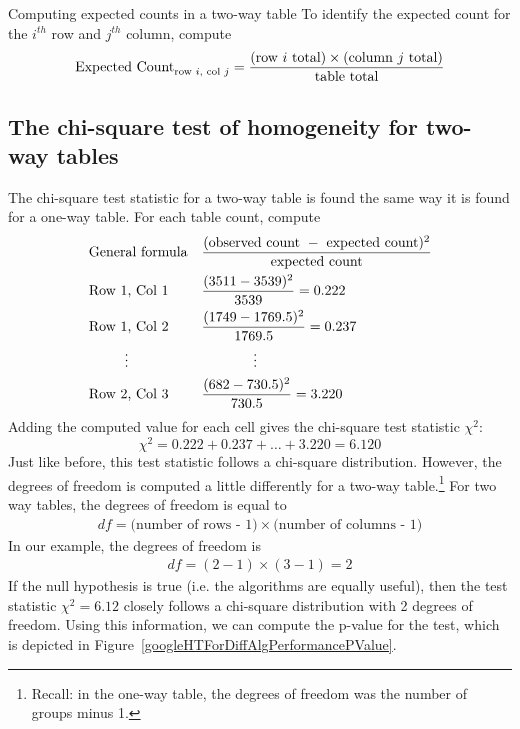 \D{\newpage}

\begin{onebox}{Computing expected counts in a two-way table}
To identify the expected count for the $i^{th}$ row and $j^{th}$ column, compute
$$\text{Expected Count}_{\text{row }i,\text{ col }j} = \frac{(\text{row $i$ total}) \times  (\text{column $j$ total})}{\text{table total}}\vspace{2mm}$$\end{onebox}


\subsection{The chi-square test of homogeneity for two-way tables}

The chi-square test statistic for a two-way table is found the same way it is found for a one-way table. For each table count, compute
\begin{align*}
&\text{General formula}& &\frac{(\text{observed count } - \text{ expected count})^2}{\text{expected count}} \\
&\text{Row 1, Col 1}& &\frac{(3511 - 3539)^2}{3539} = 0.222 \\
&\text{Row 1, Col 2}& &\frac{(1749 - 1769.5)^2}{1769.5} = 0.237 \\
& \hspace{9mm}\vdots & &\hspace{13mm}\vdots \\
&\text{Row 2, Col 3}& &\frac{(682 - 730.5)^2}{730.5} = 3.220
\end{align*}
Adding the computed value for each cell gives the chi-square test statistic $\chi^2$:
$$\chi^2 = 0.222 + 0.237 + \dots + 3.220 = 6.120$$
Just like before, this test statistic follows a chi-square distribution. However, the degrees of freedom is computed a little differently for a two-way table.\footnote{Recall: in the one-way table, the degrees of freedom was the number of groups minus 1.} For two way tables, the degrees of freedom is equal to
\begin{align*}
df = \text{(number of rows - 1)}\times \text{(number of columns - 1)}
\end{align*}
In our example, the degrees of freedom is
\begin{align*}
df = (2-1)\times (3-1) = 2
\end{align*}
If the null hypothesis is true (i.e. the algorithms are equally useful), then the test statistic $\chi^2 = 6.12$ closely follows a chi-square distribution with 2 degrees of freedom. Using this information, we can compute the p-value for the test, which is depicted in Figure~\ref{googleHTForDiffAlgPerformancePValue}.

